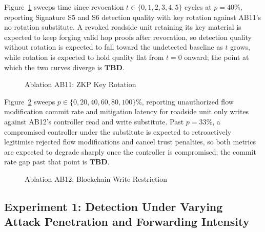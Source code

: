 \documentclass[final,5p,twocolumn]{elsarticle}
\theoremstyle{remark}
\theoremstyle{plain}
\newcommand{\TBD}{\textbf{TBD}} %
\begin{document}
Figure~\ref{fig:ab11} sweeps time since revocation $t \in
\{0,1,2,3,4,5\}$ cycles at $p{=}40\%$, reporting Signature S5 and S6
detection quality with key rotation against AB11's no rotation
substitute. A revoked roadside unit retaining its key material is
expected to keep forging valid hop proofs after revocation, so detection
quality without rotation is expected to fall toward the undetected
baseline as $t$ grows, while rotation is expected to hold quality flat
from $t{=}0$ onward; the point at which the two curves diverge is $\TBD$.
\begin{figure}[!t]
	\centering
	\caption{Ablation AB11: ZKP Key Rotation}
	\label{fig:ab11}
\end{figure}

Figure~\ref{fig:ab12} sweeps $p \in \{0,20,40,60,80,100\}\%$,
reporting unauthorized flow modification commit rate and mitigation
latency for roadside unit only writes against AB12's controller read and
write substitute. Past $p{=}33\%$, a compromised controller under the
substitute is expected to retroactively legitimise rejected flow
modifications and cancel trust penalties, so both metrics are expected to
degrade sharply once the controller is compromised; the commit rate gap
past that point is $\TBD$.
\begin{figure}[!t]
	\centering
	\caption{Ablation AB12: Blockchain Write Restriction}
	\label{fig:ab12}
\end{figure}

\subsection{Experiment 1: Detection Under Varying Attack Penetration and Forwarding Intensity}
\end{document}
